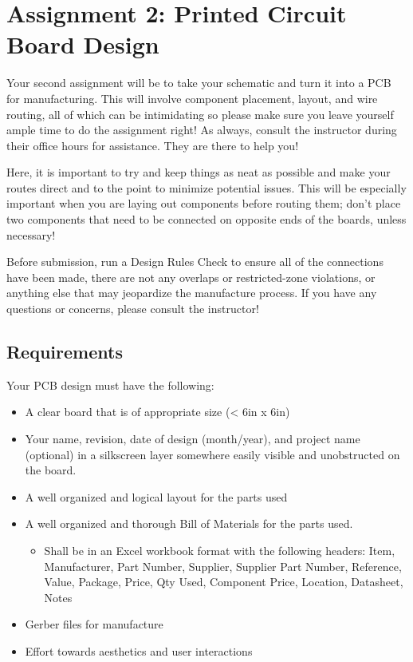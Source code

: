 \section*{Assignment 2: Printed Circuit Board Design}
Your second assignment will be to take your schematic and turn it into a PCB for manufacturing.
This will involve component placement, layout, and wire routing, all of which can be intimidating so please make sure you leave yourself ample time to do the assignment right!
As always, consult the instructor during their office hours for assistance.
They are there to help you!

Here, it is important to try and keep things as neat as possible and make your routes direct and to the point to minimize potential issues.
This will be especially important when you are laying out components before routing them; don't place two components that need to be connected on opposite ends of the boards, unless necessary!

Before submission, run a Design Rules Check to ensure all of the connections have been made, there are not any overlaps or restricted-zone violations, or anything else that may jeopardize the manufacture process.
If you have any questions or concerns, please consult the instructor!

    \subsection*{Requirements}
    Your PCB design must have the following:
    \begin{itemize}
        \item A clear board that is of appropriate size (< 6in x 6in)
        \item Your name, revision, date of design (month/year), and project name (optional) in a silkscreen layer somewhere easily visible and unobstructed on the board.
        \item A well organized and logical layout for the parts used
        \item A well organized and thorough Bill of Materials for the parts used.
        \begin{itemize}
            \item Shall be in an Excel workbook format with the following headers: Item, Manufacturer, Part Number, Supplier, Supplier Part Number, Reference, Value, Package, Price, Qty Used, Component Price, Location, Datasheet, Notes
        \end{itemize}
        \item Gerber files for manufacture
        \item Effort towards aesthetics and user interactions
    \end{itemize}

